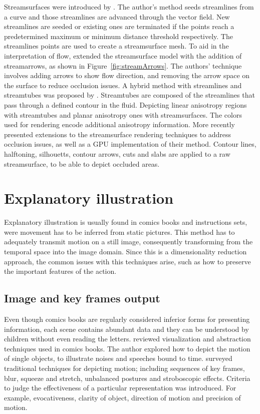 Streamsurfaces were introduced by \cite{Hultquist1992}.
The author's method seeds streamlines from a curve and those streamlines are advanced through the vector field.
New streamlines are seeded or existing ones are terminated if the points reach a predetermined maximum or minimum distance threshold respectively.
The streamlines points are used to create a streamsurface mesh.
To aid in the interpretation of flow, \cite{Loffelmann1997} extended the streamsurface model with the addition of streamarrows, as shown in Figure~\ref{fig:streamArrows}.
The authors' technique involves adding arrows to show flow direction, and removing the arrow space on the surface to reduce occlusion issues.
A hybrid method with streamlines and streamtubes was proposed by \cite{Zhang2003}.
Streamtubes are composed of the streamlines that pass through a defined contour in the fluid.
Depicting linear anisotropy regions with streamtubes and planar anisotropy ones with streamsurfaces.
The colors used for rendering encode additional anisotropy information.
More recently \cite{Born2010} presented extensions to the streamsurface rendering techniques to address occlusion issues, as well as a GPU implementation of their method.
Contour lines, halftoning, silhouetts, contour arrows, cuts and slabs are applied to a raw streamsurface, to be able to depict occluded areas.


\section{Explanatory illustration}

Explanatory illustration is usually found in comics books and instructions sets, were movement has to be inferred from static pictures.
This method has to adequately transmit motion on a still image, consequently transforming from the temporal space into the image domain.
Since this is a dimensionality reduction approach, the common issues with this techniques arise, such as how to preserve the important features of the action.

\subsection{Image and key frames output}

Even though comics books are regularly considered inferior forms for presenting information, each scene contains abundant data and they can be understood by children without even reading the letters.
\cite{McCloud1993} reviewed visualization and abstraction techniques used in comics books.
The author explored how to depict the motion of single objects, to illustrate noises and speeches bound to time.
\cite{Cutting2002} surveyed traditional techniques for depicting motion; including sequences of key frames, blur, squeeze and stretch, unbalanced postures and stroboscopic effects.
Criteria to judge the effectiveness of a particular representation was introduced.
For example, evocativeness, clarity of object, direction of motion and precision of motion.

